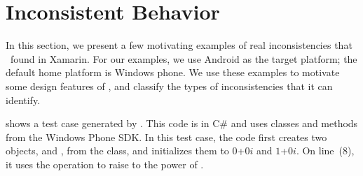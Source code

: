 \section{Inconsistent Behavior}
\label{section:example}

In this section, we present a few motivating examples of real inconsistencies
that \tool\ found in Xamarin. For our examples, we use Android as the target
platform; the default home platform is Windows phone.  We use these examples to
motivate some design features of \tool, and classify the types of
inconsistencies that it can identify. 

 shows a test case generated by \tool. This code
is in C\# and uses classes and methods from the Windows Phone SDK. In this test
case, the code first creates two objects,  and , from the
 class, and initializes them to $0$+$0i$ and
$1$+$0i$. On line~(8), it uses the  operation to raise
 to the power of .

